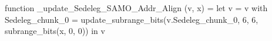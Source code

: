 function _update_Sedeleg_SAMO_Addr_Align (v, x) = let v = { v with Sedeleg_chunk_0 = update_subrange_bits(v.Sedeleg_chunk_0, 6, 6, subrange_bits(x, 0, 0)) } in
  v
